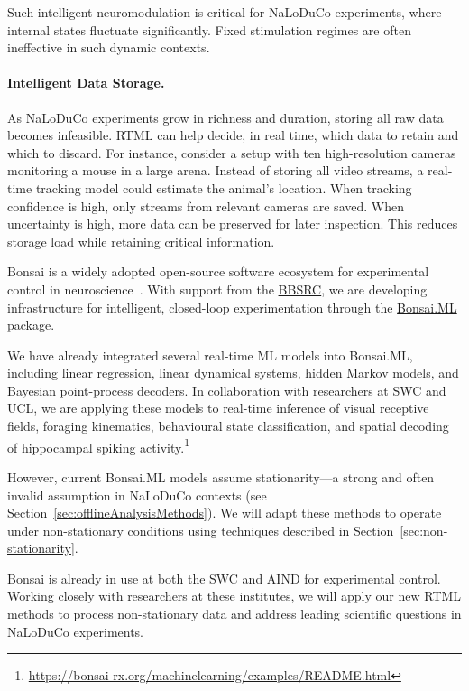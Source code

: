 Such intelligent neuromodulation is critical for NaLoDuCo experiments, where internal states fluctuate significantly. Fixed stimulation regimes are often ineffective in such dynamic contexts.

\paragraph{Intelligent Data Storage.}
As NaLoDuCo experiments grow in richness and duration, storing all raw data becomes infeasible. RTML can help decide, in real time, which data to retain and which to discard. For instance, consider a setup with ten high-resolution cameras monitoring a mouse in a large arena. Instead of storing all video streams, a real-time tracking model could estimate the animal's location. When tracking confidence is high, only streams from relevant cameras are saved. When uncertainty is high, more data can be preserved for later inspection. This reduces storage load while retaining critical information.

\label{sec:bonsai}

Bonsai is a widely adopted open-source software ecosystem for experimental control in neuroscience~\citep{lopesEtAl15}. With support from the \href{https://gow.bbsrc.ukri.org/grants/AwardDetails.aspx?FundingReference=BB\%2FW019132\%2F1}{BBSRC}, we are developing infrastructure for intelligent, closed-loop experimentation through the \href{https://bonsai-rx.org/machinelearning/}{Bonsai.ML} package.

We have already integrated several real-time ML models into Bonsai.ML, including linear regression, linear dynamical systems, hidden Markov models, and Bayesian point-process decoders. In collaboration with researchers at SWC and UCL, we are applying these models to real-time inference of visual receptive fields, foraging kinematics, behavioural state classification, and spatial decoding of hippocampal spiking activity.\footnote{\url{https://bonsai-rx.org/machinelearning/examples/README.html}}

However, current Bonsai.ML models assume stationarity—a strong and often invalid assumption in NaLoDuCo contexts (see Section~\ref{sec:offlineAnalysisMethods}). We will adapt these methods to operate under non-stationary conditions using techniques described in Section~\ref{sec:non-stationarity}.

Bonsai is already in use at both the SWC and AIND for experimental control. Working closely with researchers at these institutes, we will apply our new RTML methods to process non-stationary data and address leading scientific questions in NaLoDuCo experiments.

